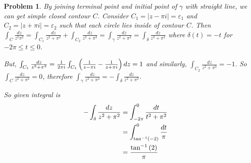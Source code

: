 \documentclass{oblivoir}
\newtheorem{problem}{Problem}
\begin{document}
\begin{problem}
	By joining terminal point and initial point of $\gamma$ with straight line, we can get simple closed contour $C$. Consider $C_1 = |z -\pi i | = \varepsilon_1$ and $C_2 = | z + \pi i | = \varepsilon_2$ such that each circle lies inside of contour $C$. Then $\int_C \frac{dz}{z^2 \pi^2} = \int_{C_1} \frac{dz}{z^2 + \pi^2} + \int_{C_2}\frac{dz}{z^2 + \pi^2} = \int_{\gamma} \frac{dz}{z^2 + \pi^2} = \int_{\delta}\frac{dz}{z^2 + \pi^2}$ where $\delta(t) = -t$ for $-2\pi \leq t \leq 0$.	

	But, $\int_{C_1}\frac{dz}{z^2 + \pi^2} = {1\over 2\pi i} \int_{C_1}\left( {1 \over z - \pi i} - {1 \over z + \pi i} \right)dz = 1$ and similarly, $\int_{C_2}\frac{dz}{z^2+\pi^2} = -1$. So $\int_{C}\frac{dz}{z^2 + \pi^2} = 0$, therefore $\int_{\gamma}\frac{dz}{z^2 + \pi^2} = -\int_{\delta}\frac{dz}{z^2+\pi^2}$.

	So given integral is
	\begin{equation}
		\begin{split}
			-\int_{\delta}\frac{dz}{z^2+\pi^2} & = \int_{-2\pi}^0 \frac{dt}{t^2 + \pi^2} \\
			& = \int_{\tan^{-1}\left( -2 \right)}^0 {dt \over \pi} \\
			& = {\tan^{-1}\left( 2 \right) \over \pi}
		\end{split}
		\label{<+label+>}
	\end{equation}
\end{problem}
\end{document}
